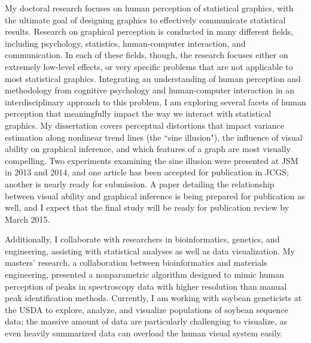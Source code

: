 \documentclass[11pt,letterpaper,sans,unicode]{moderncv}        %
\begin{document}
My doctoral research focuses on human perception of statistical graphics, with the ultimate goal of designing graphics to effectively communicate statistical results. Research on graphical perception is conducted in many different fields, including psychology, statistics, human-computer interaction, and communication. In each of these fields, though, the research focuses either on extremely low-level effects, or very specific problems that are not applicable to most statistical graphics. Integrating an understanding of human perception and methodology from cognitive psychology and human-computer interaction in an interdisciplinary approach to this problem, I am exploring several facets of human perception that meaningfully impact the way we interact with statistical graphics. My dissertation covers perceptual distortions that impact variance estimation along nonlinear trend lines (the ``sine illusion"), the influence of visual ability on graphical inference, and which features of a graph are most visually compelling. Two experiments examining the sine illusion were presented at JSM in 2013 and 2014, and one article has been accepted for publication in JCGS; another is nearly ready for submission. A paper detailing the relationship between visual ability and graphical inference is being prepared for publication as well, and I expect that the final study will be ready for publication review by March 2015. 

Additionally, I collaborate with researchers in bioinformatics, genetics, and engineering, assisting with statistical analyses as well as data visualization. My masters' research, a collaboration between bioinformatics and materials engineering, presented a nonparametric algorithm designed to mimic human perception of peaks in spectroscopy data with higher resolution than manual peak identification methods. Currently, I am working with soybean geneticists at the USDA to explore, analyze, and visualize populations of soybean sequence data; the massive amount of data are particularly challenging to visualize, as even heavily summarized data can overload the human visual system easily. 
\end{document}
